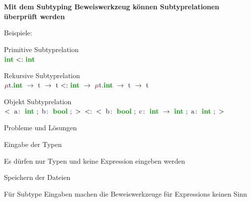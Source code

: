 {

  \textbf{Mit dem Subtyping Beweiswerkzeug können Subtyprelationen überprüft werden} \\[6mm]
  \begin{itemgroup}{Beispiele:}
    \item Primitive Subtyprelation \\  $\TypeSubType {\TypeIntegerType} {\TypeIntegerType} $
    \item Rekursive Subtyprelation \\  $\TypeSubType{ \TypeRecType{\TypeTypeName{t} } {\TypeArrowType
       {\TypeIntegerType }{\TypeArrowType{\TypeTypeName{t}}{\TypeTypeName{t}}}}}
       {\TypeArrowType{\TypeIntegerType}{\TypeRecType{\TypeTypeName{t}}{\TypeArrowType
       {\TypeIntegerType}{\TypeArrowType{\TypeTypeName{t}}{\TypeTypeName{t}}}}}} $
    \item Objekt Subtyprelation \\     $\TypeSubType{\TypeObjectType{\TypeRowType{{\ExprIdentifier{a}}
       \colon\ {\TypeIntegerType}\ ;\ {\ExprIdentifier{b}}\colon\  \TypeBooleanType}\ ;}} 
       {\TypeObjectType{\TypeRowType{{\ExprIdentifier{b}}\colon\ {\TypeBooleanType}\ ;\ {\ExprIdentifier{c}}
       \colon\ {\TypeArrowType{\TypeIntegerType}{\TypeIntegerType}}\ ;\ {\ExprIdentifier{a}}\colon\ {\TypeIntegerType}
       \ ;}}}$
    \end{itemgroup}
}
{
  \begin{itemgroup}{Probleme und Lösungen}
    \item Eingabe der Typen
    \item Es dürfen nur Typen und keine Expression eingeben werden
    \item Speichern der Dateien
    \item Für Subtype Eingaben machen die Beweiswerkzeuge für Expressions keinen Sinn
    \end{itemgroup}
}


